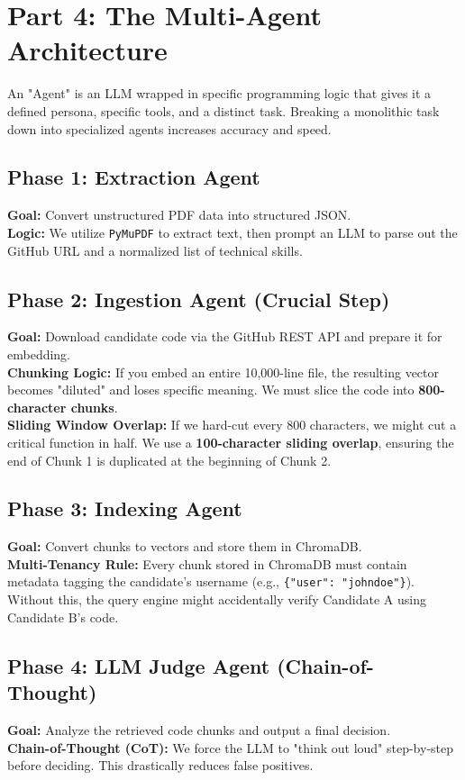 \documentclass[12pt,a4paper]{article}
\begin{document}
\section{Part 4: The Multi-Agent Architecture}

An "Agent" is an LLM wrapped in specific programming logic that gives it a defined persona, specific tools, and a distinct task. Breaking a monolithic task down into specialized agents increases accuracy and speed.

\subsection{Phase 1: Extraction Agent}
\textbf{Goal:} Convert unstructured PDF data into structured JSON. \\
\textbf{Logic:} We utilize \texttt{PyMuPDF} to extract text, then prompt an LLM to parse out the GitHub URL and a normalized list of technical skills.

\subsection{Phase 2: Ingestion Agent (Crucial Step)}
\textbf{Goal:} Download candidate code via the GitHub REST API and prepare it for embedding. \\
\textbf{Chunking Logic:} If you embed an entire 10,000-line file, the resulting vector becomes "diluted" and loses specific meaning. We must slice the code into \textbf{800-character chunks}. \\
\textbf{Sliding Window Overlap:} If we hard-cut every 800 characters, we might cut a critical function in half. We use a \textbf{100-character sliding overlap}, ensuring the end of Chunk 1 is duplicated at the beginning of Chunk 2.

\subsection{Phase 3: Indexing Agent}
\textbf{Goal:} Convert chunks to vectors and store them in ChromaDB. \\
\textbf{Multi-Tenancy Rule:} Every chunk stored in ChromaDB must contain metadata tagging the candidate's username (e.g., \texttt{\{"user": "johndoe"\}}). Without this, the query engine might accidentally verify Candidate A using Candidate B's code.

\subsection{Phase 4: LLM Judge Agent (Chain-of-Thought)}
\textbf{Goal:} Analyze the retrieved code chunks and output a final decision. \\
\textbf{Chain-of-Thought (CoT):} We force the LLM to "think out loud" step-by-step before deciding. This drastically reduces false positives.
\end{document}
